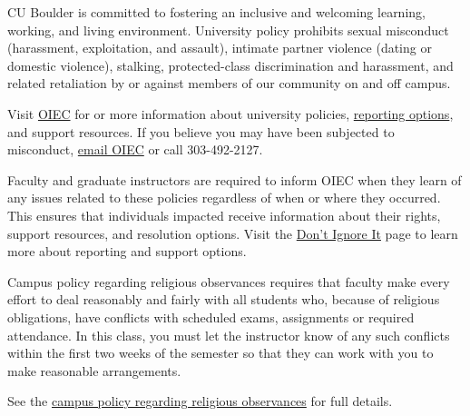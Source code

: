 \item[Sexual Misconduct, Discrimination, Harassment and/or Related Retaliation:] 
CU Boulder is committed to fostering an inclusive and welcoming learning, working, and living environment.
University policy prohibits sexual misconduct (harassment, exploitation, and assault), intimate partner violence (dating or domestic violence), stalking, protected-class discrimination and harassment, and related retaliation by or against members of our community on and off campus.

Visit \href{http://www.colorado.edu/institutionalequity/}{OIEC} for or more information about university policies, \href{https://www.colorado.edu/oiec/reporting-resolutions/making-report}{reporting options}, and support resources. 
If you believe you may have been subjected to misconduct, \href{mailto:cureport@colorado.edu}{email OIEC} or call 303-492-2127.

Faculty and graduate instructors are required to inform OIEC when they learn of any issues related to these policies regardless of when or where they occurred. 
This ensures that individuals impacted receive information about their rights, support resources, and resolution options. 
Visit the \href{https://www.colorado.edu/dontignoreit/}{Don’t Ignore It} page to learn more about reporting and support options.

\item[Religious Holidays:] 
Campus policy regarding religious observances requires that faculty make every effort to deal reasonably and fairly with all students who, because of religious obligations, have conflicts with scheduled exams, assignments or required attendance. 
In this class, you must let the instructor know of any such conflicts within the first two weeks of the semester so that they can work with you to make reasonable arrangements.

See the \href{http://www.colorado.edu/policies/observance-religious-holidays-and-absences-classes-andor-exams}{campus policy regarding religious observances} for full details.